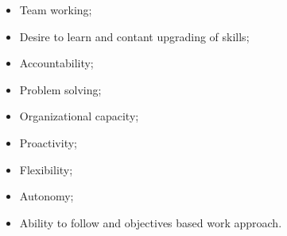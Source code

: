 \begin{minipage}[t]{0.5\textwidth}
	\begin{itemize}
		\item Team working;
		\item Desire to learn and contant upgrading of skills;
		\item Accountability;
		\item Problem solving;
		\item Organizational capacity;
	\end{itemize}
\end{minipage}
\begin{minipage}[t]{0.5\textwidth}
	\begin{itemize}
		\item Proactivity;
		\item Flexibility;
		\item Autonomy;
		\item Ability to follow and objectives based work approach.
	\end{itemize}
\end{minipage}

\vspace{5pt}